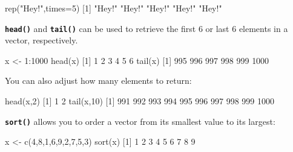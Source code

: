 \documentclass[
]{book}
\newenvironment{Shaded}{\begin{snugshade}}{\end{snugshade}}
\newcommand{\AttributeTok}[1]{\textcolor[rgb]{0.77,0.63,0.00}{#1}}
\newcommand{\DecValTok}[1]{\textcolor[rgb]{0.00,0.00,0.81}{#1}}
\newcommand{\FunctionTok}[1]{\textcolor[rgb]{0.00,0.00,0.00}{#1}}
\newcommand{\NormalTok}[1]{#1}
\newcommand{\OtherTok}[1]{\textcolor[rgb]{0.56,0.35,0.01}{#1}}
\newcommand{\SpecialCharTok}[1]{\textcolor[rgb]{0.00,0.00,0.00}{#1}}
\newcommand{\StringTok}[1]{\textcolor[rgb]{0.31,0.60,0.02}{#1}}
\begin{document}
\begin{Shaded}
\begin{Highlighting}[]
\FunctionTok{rep}\NormalTok{(}\StringTok{"Hey!"}\NormalTok{,}\AttributeTok{times=}\DecValTok{5}\NormalTok{)}
\NormalTok{[}\DecValTok{1}\NormalTok{] }\StringTok{"Hey!"} \StringTok{"Hey!"} \StringTok{"Hey!"} \StringTok{"Hey!"} \StringTok{"Hey!"}
\end{Highlighting}
\end{Shaded}

\textbf{\texttt{head()}} and \textbf{\texttt{tail()}} can be used to retrieve the first 6 or last 6 elements in a vector, respectively.

\begin{Shaded}
\begin{Highlighting}[]
\NormalTok{x }\OtherTok{\textless{}{-}} \DecValTok{1}\SpecialCharTok{:}\DecValTok{1000}
\FunctionTok{head}\NormalTok{(x)}
\NormalTok{[}\DecValTok{1}\NormalTok{] }\DecValTok{1} \DecValTok{2} \DecValTok{3} \DecValTok{4} \DecValTok{5} \DecValTok{6}
\FunctionTok{tail}\NormalTok{(x)}
\NormalTok{[}\DecValTok{1}\NormalTok{]  }\DecValTok{995}  \DecValTok{996}  \DecValTok{997}  \DecValTok{998}  \DecValTok{999} \DecValTok{1000}
\end{Highlighting}
\end{Shaded}

You can also adjust how many elements to return:

\begin{Shaded}
\begin{Highlighting}[]
\FunctionTok{head}\NormalTok{(x,}\DecValTok{2}\NormalTok{)}
\NormalTok{[}\DecValTok{1}\NormalTok{] }\DecValTok{1} \DecValTok{2}
\FunctionTok{tail}\NormalTok{(x,}\DecValTok{10}\NormalTok{)}
\NormalTok{ [}\DecValTok{1}\NormalTok{]  }\DecValTok{991}  \DecValTok{992}  \DecValTok{993}  \DecValTok{994}  \DecValTok{995}  \DecValTok{996}  \DecValTok{997}  \DecValTok{998}  \DecValTok{999} \DecValTok{1000}
\end{Highlighting}
\end{Shaded}

\textbf{\texttt{sort()}} allows you to order a vector from its smallest value to its largest:

\begin{Shaded}
\begin{Highlighting}[]
\NormalTok{x }\OtherTok{\textless{}{-}} \FunctionTok{c}\NormalTok{(}\DecValTok{4}\NormalTok{,}\DecValTok{8}\NormalTok{,}\DecValTok{1}\NormalTok{,}\DecValTok{6}\NormalTok{,}\DecValTok{9}\NormalTok{,}\DecValTok{2}\NormalTok{,}\DecValTok{7}\NormalTok{,}\DecValTok{5}\NormalTok{,}\DecValTok{3}\NormalTok{)}
\FunctionTok{sort}\NormalTok{(x)}
\NormalTok{[}\DecValTok{1}\NormalTok{] }\DecValTok{1} \DecValTok{2} \DecValTok{3} \DecValTok{4} \DecValTok{5} \DecValTok{6} \DecValTok{7} \DecValTok{8} \DecValTok{9}
\end{Highlighting}
\end{Shaded}
\end{document}
